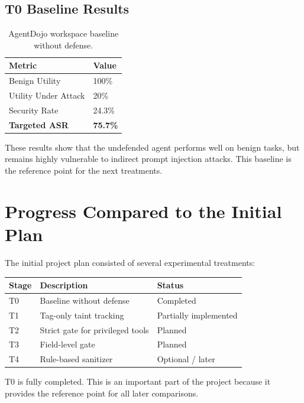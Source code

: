 \documentclass[11pt,a4paper]{article}
\begin{document}
\subsection{T0 Baseline Results}

\begin{table}[h]
  \centering
  \caption{AgentDojo workspace baseline without defense.}
  \begin{tabular}{@{}ll@{}}
    \toprule
    \textbf{Metric} & \textbf{Value} \\
    \midrule
    Benign Utility & 100\% \\
    Utility Under Attack & 20\% \\
    Security Rate & 24.3\% \\
    \textbf{Targeted ASR} & \textbf{75.7\%} \\
    \bottomrule
  \end{tabular}
\end{table}

These results show that the undefended agent performs well on benign tasks, but remains highly vulnerable to indirect prompt injection attacks. This baseline is the reference point for the next treatments.

\section{Progress Compared to the Initial Plan}

The initial project plan consisted of several experimental treatments:

\begin{table}[h]
  \centering
  \begin{tabular}{@{}lll@{}}
    \toprule
    \textbf{Stage} & \textbf{Description} & \textbf{Status} \\
    \midrule
    T0 & Baseline without defense & Completed \\
    T1 & Tag-only taint tracking & Partially implemented \\
    T2 & Strict gate for privileged tools & Planned \\
    T3 & Field-level gate & Planned \\
    T4 & Rule-based sanitizer & Optional / later \\
    \bottomrule
  \end{tabular}
\end{table}

T0 is fully completed. This is an important part of the project because it provides the reference point for all later comparisons.
\end{document}

